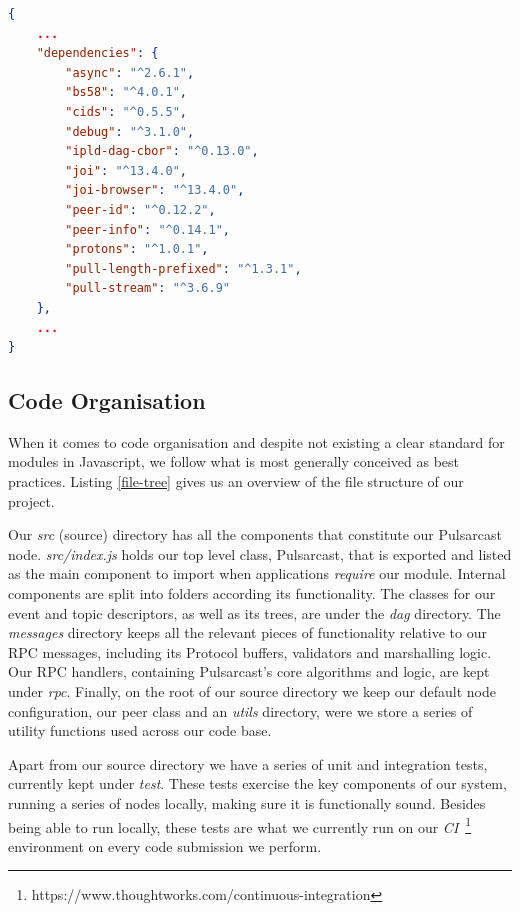 \begin{lstlisting}[language=JSON, float, caption={Pulsarcast module dependency list},label={dependencies}]
{
	...
	"dependencies": {
		"async": "^2.6.1",
		"bs58": "^4.0.1",
		"cids": "^0.5.5",
		"debug": "^3.1.0",
		"ipld-dag-cbor": "^0.13.0",
		"joi": "^13.4.0",
		"joi-browser": "^13.4.0",
		"peer-id": "^0.12.2",
		"peer-info": "^0.14.1",
		"protons": "^1.0.1",
		"pull-length-prefixed": "^1.3.1",
		"pull-stream": "^3.6.9"
	},
	...
}
\end{lstlisting}

\subsection{Code Organisation}\label{subsec:code-organisation}

When it comes to code organisation and despite not existing a clear standard
for modules in Javascript, we follow what is most generally conceived as best
practices. Listing \ref{file-tree} gives us an overview of the file structure
of our project. 

Our \emph{src} (source) directory has all the components that constitute our
Pulsarcast node. \emph{src/index.js} holds our top level class, Pulsarcast,
that is exported and listed as the main component to import when applications
\emph{require} our module. Internal components are split into folders according
its functionality. The classes for our event and topic descriptors, as well as
its trees, are under the \emph{dag} directory. The \emph{messages} directory
keeps all the relevant pieces of functionality relative to our RPC messages,
including its Protocol buffers, validators and marshalling logic. Our RPC
handlers, containing Pulsarcast's core algorithms and logic, are kept under
\emph{rpc}. Finally, on the root of our source directory we keep our default
node configuration, our peer class and an \emph{utils} directory, were we store
a series of utility functions used across our code base.

Apart from our source directory we have a series of unit and integration tests,
currently kept under \emph{test}. These tests exercise the key components of
our system, running a series of nodes locally, making sure it is functionally
sound. Besides being able to run locally, these tests are what we currently run
on our \emph{CI}~\footnote{https://www.thoughtworks.com/continuous-integration}
environment on every code submission we perform.

